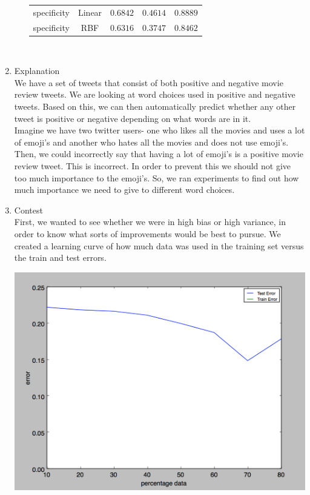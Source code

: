 \documentclass[11pt]{article}
\begin{document}
\begin{enumerate}
\begin{enumerate}[(a)]
\begin{tabular}{| c | c | c | c | c |}
specificity & Linear & $0.6842$ & $0.4614$ & $0.8889$ \\
specificity & RBF & $0.6316$ & $0.3747$ & $0.8462$ \\
\hline
\end{tabular} \\
\end{enumerate}
\item Explanation \\
We have a set of tweets that consist of both positive and negative movie review tweets. We are looking at word choices used in positive and negative tweets. Based on this, we can then automatically predict whether any other tweet is positive or negative depending on what words are in it. \\
Imagine we have two twitter users- one who likes all the movies and uses a lot of emoji's and another who hates all the movies and does not use emoji's. Then, we could incorrectly say that having a lot of emoji's is a positive movie review tweet. This is incorrect. In order to prevent this we should not give too much importance to the emoji's. So, we ran experiments to find out how much importance we need to give to different word choices. 
\item Contest\\
First, we wanted to see whether we were in high bias or high variance, in order to know what sorts of improvements would be best to pursue. We created a learning curve of how much data was used in the training set versus the train and test errors.

\includegraphics[scale=0.7]{learningcurve}


\end{enumerate}
\end{document}

